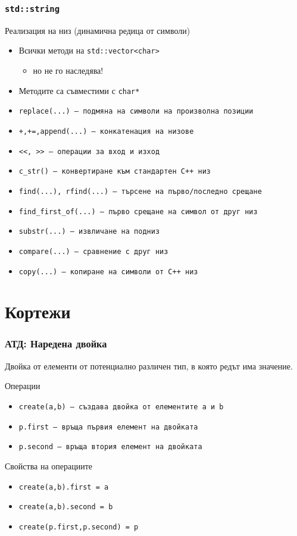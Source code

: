 \documentclass{beamer}
\begin{document}
\begin{frame}
  \frametitle{\tt{std::string}}

  Реализация на низ (динамична редица от символи)
  \begin{itemize}
  \item Всички методи на \tt{std::vector<char>}
    \begin{itemize}
    \item \alert{но не го наследява!}
    \end{itemize}
  \item Методите са съвместими с \tt{char*}
  \item \tt{replace(...)} --- подмяна на символи на произволна позиции
  \item \tt{+,+=,append(...)} --- конкатенация на низове
  \item \tt{<{}<, >{}>} --- операции за вход и изход
  \item \tt{c\_str()} --- конвертиране към стандартен C++ низ
  \item \tt{find(...), rfind(...)} --- търсене на първо/последно срещане
  \item \tt{find\_first\_of(...)} --- първо срещане на символ от друг низ
  \item \tt{substr(...)} --- извличане на подниз
  \item \tt{compare(...)} --- сравнение с друг низ
  \item \tt{copy(...)} --- копиране на символи от C++ низ
  \end{itemize}
\end{frame}

\section{Кортежи}

\begin{frame}
  \frametitle{АТД: Наредена двойка}

  Двойка от елементи от потенциално различен тип, в която редът има значение.
  \vspace{0.5em}

  Операции
  \vspace{0.5em}

  \begin{itemize}
  \item \tt{create(a,b)} --- създава двойка от елементите \tt a и \tt b
  \item \tt{p.first} --- връща първия елемент на двойката
  \item \tt{p.second} --- връща втория елемент на двойката
  \end{itemize}
  \vspace{0.5em}

  Свойства на операциите
  \vspace{0.5em}

  \begin{itemize}
  \item \tt{create(a,b).first} = \tt a
  \item \tt{create(a,b).second} = \tt b
  \item \tt{create(p.first,p.second)} = \tt p
  \end{itemize}
\end{frame}
\end{document}
